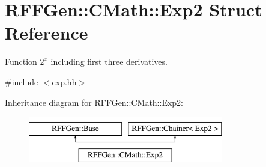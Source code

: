 \hypertarget{structRFFGen_1_1CMath_1_1Exp2}{\section{R\-F\-F\-Gen\-:\-:C\-Math\-:\-:Exp2 Struct Reference}
\label{structRFFGen_1_1CMath_1_1Exp2}
}


Function $2^x$ including first three derivatives.  




{\ttfamily \#include $<$exp.\-hh$>$}

Inheritance diagram for R\-F\-F\-Gen\-:\-:C\-Math\-:\-:Exp2\-:\begin{figure}[H]
\begin{center}
\leavevmode
\includegraphics[height=2.000000cm]{structRFFGen_1_1CMath_1_1Exp2}
\end{center}
\end{figure}

